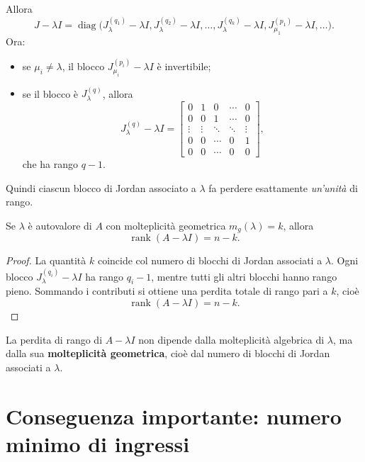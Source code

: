 Allora
\[
J-\lambda I=
\operatorname{diag}\!\bigl(
J_\lambda^{(q_1)}-\lambda I,
J_\lambda^{(q_2)}-\lambda I,
\dots,
J_\lambda^{(q_k)}-\lambda I,
J_{\mu_1}^{(p_1)}-\lambda I,
\dots
\bigr).
\]
Ora:
\begin{itemize}
    \item se \(\mu_i\neq \lambda\), il blocco \(J_{\mu_i}^{(p_i)}-\lambda I\) è invertibile;
    \item se il blocco è \(J_\lambda^{(q)}\), allora
    \[
    J_\lambda^{(q)}-\lambda I
    =
    \begin{bmatrix}
    0 & 1 & 0 & \cdots & 0\\
    0 & 0 & 1 & \cdots & 0\\
    \vdots & \vdots & \ddots & \ddots & \vdots\\
    0 & 0 & \cdots & 0 & 1\\
    0 & 0 & \cdots & 0 & 0
    \end{bmatrix},
    \]
    che ha rango \(q-1\).
\end{itemize}

Quindi ciascun blocco di Jordan associato a \(\lambda\) fa perdere esattamente \emph{un’unità} di rango.

\begin{proposizione}
Se \(\lambda\) è autovalore di \(A\) con molteplicità geometrica \(m_g(\lambda)=k\), allora
\begin{equation}
\operatorname{rank}(A-\lambda I)=n-k.
\label{eq:L13_rank_deficiency}
\end{equation}
\end{proposizione}

\begin{proof}
La quantità \(k\) coincide col numero di blocchi di Jordan associati a \(\lambda\).  
Ogni blocco \(J_\lambda^{(q_i)}-\lambda I\) ha rango \(q_i-1\), mentre tutti gli altri blocchi hanno rango pieno. Sommando i contributi si ottiene una perdita totale di rango pari a \(k\), cioè
\[
\operatorname{rank}(A-\lambda I)=n-k.
\]
\end{proof}

\begin{osservazione}
La perdita di rango di \(A-\lambda I\) non dipende dalla molteplicità algebrica di \(\lambda\), ma dalla sua \textbf{molteplicità geometrica}, cioè dal numero di blocchi di Jordan associati a \(\lambda\).
\end{osservazione}

\section{Conseguenza importante: numero minimo di ingressi}

